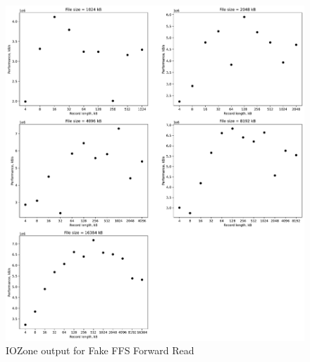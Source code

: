 \begin{figure}[!htb]
	\label{fig:app_bench_fffs_rnd_read}
	\begin{center}
		\includegraphics[width=1.0\textwidth]{figures/benchmarking/fake-ffs/Read.pdf}
	\end{center}
	\caption{IOZone output for Fake FFS Forward Read}
\end{figure}

